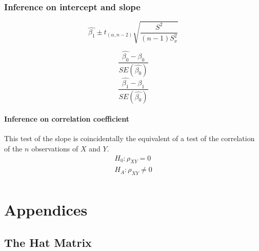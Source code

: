 \documentclass[12pt, a4paper]{article}
\begin{document}
\subsection{Inference on intercept and slope}
\begin{equation}
\hat{\beta_{1}} \pm t_{(\alpha, n-2) }
\sqrt{\frac{S^2}{(n-1)S^{2}_{x}}}
\end{equation}

\begin{equation}
\frac{\hat{\beta_{0}}-\beta_{0}}{SE(\hat{\beta_{0}})}
\end{equation}
\begin{equation}
\frac{\hat{\beta_{1}}-\beta_{1}}{SE(\hat{\beta_{0}})}
\end{equation}


\subsubsection{Inference on correlation coefficient} This test of
the slope is coincidentally the equivalent of a test of the
correlation of the $n$ observations of $X$ and $Y$.
\begin{eqnarray}
H_{0}: \rho_{XY} = 0 \nonumber \\
H_{A}: \rho_{XY} \ne 0 \nonumber \\
\end{eqnarray}

\newpage


\chapter{Appendices} %
\newpage
\section{The Hat Matrix} %
\end{document}
